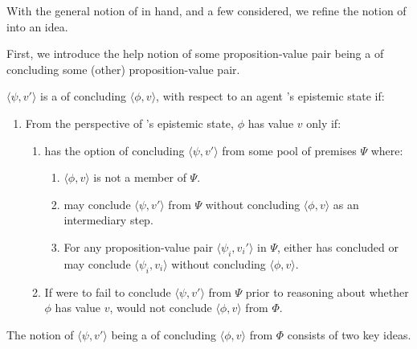 \begin{note}
  With the general notion of \csN{} in hand, and a few  considered, we refine the notion of \csN{} into an idea.

  First, we introduce the help notion of some proposition-value pair being a \requ{} of concluding some (other) proposition-value pair.

  \begin{notion}[\requ{3}]
    \label{notion:overview:requ}
    \(\langle \psi,v' \rangle\) is a \requ{} of concluding \(\langle \phi,v \rangle\), with respect to an agent \vAgent{}'s epistemic state if:
    \begin{enumerate}
    \item
      \label{notion:overview:requ:main}
      From the perspective of \vAgent{}'s epistemic state, \(\phi\) has value \(v\) only if:
      \begin{enumerate}[label=\alph*., ref=\named{R:\alph*}]
      \item
        \label{notion:overview:requ:pool}
        \vAgent{} has the option of concluding \(\langle \psi, v' \rangle\) from some pool of premises \(\Psi\) where:
        \begin{enumerate}[label=\roman*., ref=\named{R:a.\roman*}, series=csIdeaCounter]
        \item
          \label{notion:overview:requ:pool:incl}
          \(\langle \phi,v \rangle\) is not a member of \(\Psi\).
        \item
          \label{notion:overview:requ:pool:int}
          \vAgent{} may conclude \(\langle \psi,v' \rangle\) from \(\Psi\) without concluding \(\langle \phi,v \rangle\) as an intermediary step.
        \item
          \label{notion:overview:requ:pool:ind}
          For any proposition-value pair \(\langle \psi_{i}, v_{i}' \rangle\) in \(\Psi\), \vAgent{} either has concluded or may conclude \(\langle \psi_{i}, v_{i} \rangle\) without concluding \(\langle \phi,v \rangle\).
        \end{enumerate}
      \item
        \label{notion:overview:requ:nPsi-nPhi}
        If \vAgent{} were to fail to conclude \(\langle \psi,v' \rangle\) from \(\Psi\) prior to reasoning about whether \(\phi\) has value \(v\), \vAgent{} would not conclude \(\langle \phi,v \rangle\) from \(\Phi\).
      \end{enumerate}
    \end{enumerate}
    \vspace{-\baselineskip}
  \end{notion}
  The notion of \(\langle \psi,v' \rangle\) being a \requ{} of concluding \(\langle \phi,v \rangle\) from \(\Phi\) consists of two key ideas.
\end{note}

